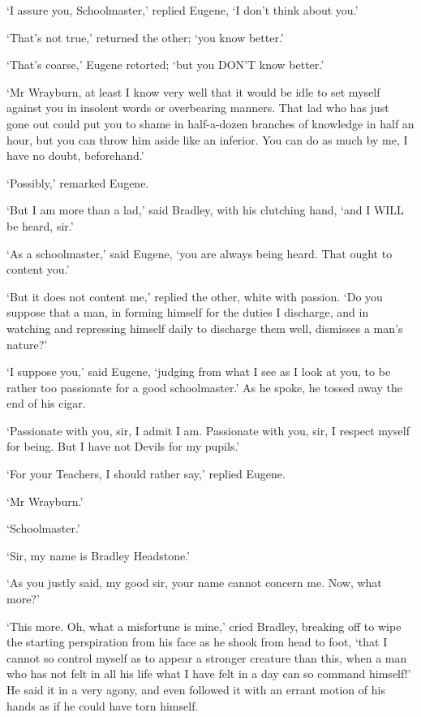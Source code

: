 ‘I assure you, Schoolmaster,’ replied Eugene, ‘I don’t think about you.’

‘That’s not true,’ returned the other; ‘you know better.’

‘That’s coarse,’ Eugene retorted; ‘but you DON’T know better.’

‘Mr Wrayburn, at least I know very well that it would be idle to set
myself against you in insolent words or overbearing manners. That lad
who has just gone out could put you to shame in half-a-dozen branches of
knowledge in half an hour, but you can throw him aside like an inferior.
You can do as much by me, I have no doubt, beforehand.’

‘Possibly,’ remarked Eugene.

‘But I am more than a lad,’ said Bradley, with his clutching hand, ‘and
I WILL be heard, sir.’

‘As a schoolmaster,’ said Eugene, ‘you are always being heard. That
ought to content you.’

‘But it does not content me,’ replied the other, white with passion. ‘Do
you suppose that a man, in forming himself for the duties I discharge,
and in watching and repressing himself daily to discharge them well,
dismisses a man’s nature?’

‘I suppose you,’ said Eugene, ‘judging from what I see as I look at you,
to be rather too passionate for a good schoolmaster.’ As he spoke, he
tossed away the end of his cigar.

‘Passionate with you, sir, I admit I am. Passionate with you, sir, I
respect myself for being. But I have not Devils for my pupils.’

‘For your Teachers, I should rather say,’ replied Eugene.

‘Mr Wrayburn.’

‘Schoolmaster.’

‘Sir, my name is Bradley Headstone.’

‘As you justly said, my good sir, your name cannot concern me. Now, what
more?’

‘This more. Oh, what a misfortune is mine,’ cried Bradley, breaking off
to wipe the starting perspiration from his face as he shook from head to
foot, ‘that I cannot so control myself as to appear a stronger creature
than this, when a man who has not felt in all his life what I have felt
in a day can so command himself!’ He said it in a very agony, and even
followed it with an errant motion of his hands as if he could have torn
himself.

